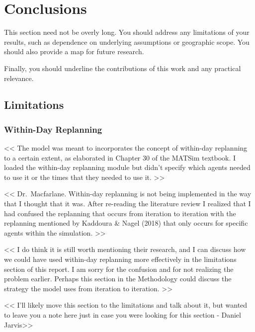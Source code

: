 \documentclass[fancy, oneside, mastersfancy, ms]{byuthesis}
\begin{document}

\hypertarget{sec-conclusions}{%
\chapter{Conclusions}\label{sec-conclusions}}

This section need not be overly long. You should address any limitations
of your results, such as dependence on underlying assumptions or
geographic scope. You should also provide a map for future research.

Finally, you should underline the contributions of this work and any
practical relevance.

\hypertarget{sec-limitations}{%
\section{Limitations}\label{sec-limitations}}

\hypertarget{within-day-replanning}{%
\subsection{Within-Day Replanning}\label{within-day-replanning}}

\textless\textless{} The model was meant to incorporates the concept of
within-day replanning to a certain extent, as elaborated in Chapter 30
of the MATSim textbook. I loaded the within-day replanning module but
didn't specify which agents needed to use it or the times that they
needed to use it. \textgreater\textgreater{}

\textless\textless{} Dr.~Macfarlane. Within-day replanning is not being
implemented in the way that I thought that it was. After re-reading the
literature review I realized that I had confused the replanning that
occurs from iteration to iteration with the replanning mentioned by
Kaddoura \& Nagel (2018) that only occurs for specific agents within the
simulation. \textgreater\textgreater{}

\textless\textless{} I do think it is still worth mentioning their
research, and I can discuss how we could have used within-day replanning
more effectively in the limitations section of this report. I am sorry
for the confusion and for not realizing the problem earlier. Perhaps
this section in the Methodology could discuss the strategy the model
uses from iteration to iteration. \textgreater\textgreater{}

\textless\textless{} I'll likely move this section to the limitations
and talk about it, but wanted to leave you a note here just in case you
were looking for this section - Daniel Jarvis\textgreater\textgreater{}
\end{document}
